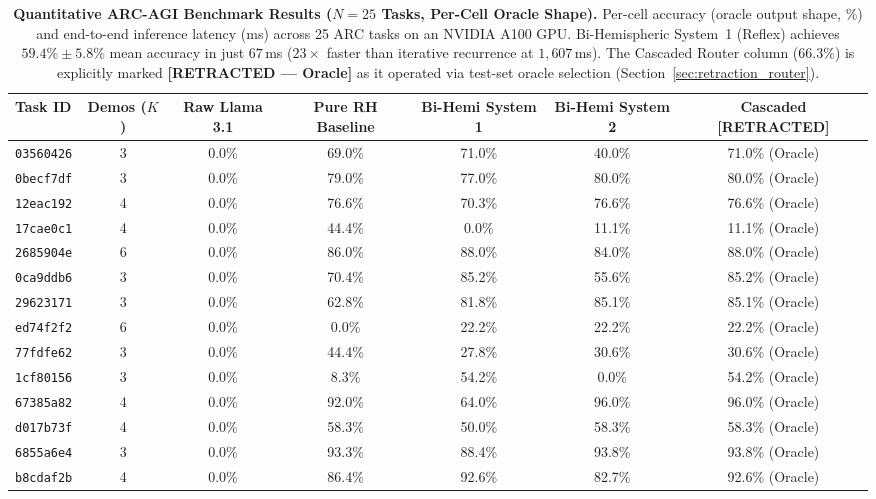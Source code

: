 \documentclass[11pt,a4paper]{article}
\theoremstyle{plain}
\theoremstyle{definition}
\theoremstyle{remark}
\begin{document}
\begin{table}[t]
\centering
\caption{\textbf{Quantitative ARC-AGI Benchmark Results ($N = 25$ Tasks, Per-Cell Oracle Shape).} Per-cell accuracy (oracle output shape, \%) and end-to-end inference latency (ms) across 25 ARC tasks on an NVIDIA A100 GPU. Bi-Hemispheric System~1 (Reflex) achieves $59.4\% \pm 5.8\%$ mean accuracy in just $67$\,ms ($23\times$ faster than iterative recurrence at $1{,}607$\,ms). The Cascaded Router column ($66.3\%$) is explicitly marked \textbf{[RETRACTED --- Oracle]} as it operated via test-set oracle selection (Section~\ref{sec:retraction_router}).}
\label{tab:benchmark_results}
\small
\begin{tabular}{lcccccc}
\toprule
\textbf{Task ID} & \textbf{Demos ($K$)} & \textbf{Raw Llama 3.1} & \textbf{Pure RH Baseline} & \textbf{Bi-Hemi System 1} & \textbf{Bi-Hemi System 2} & \textbf{Cascaded [RETRACTED]} \\
\midrule
\texttt{03560426} & 3 & 0.0\% & 69.0\% & 71.0\% & 40.0\% & 71.0\% (Oracle) \\
\texttt{0becf7df} & 3 & 0.0\% & 79.0\% & 77.0\% & 80.0\% & 80.0\% (Oracle) \\
\texttt{12eac192} & 4 & 0.0\% & 76.6\% & 70.3\% & 76.6\% & 76.6\% (Oracle) \\
\texttt{17cae0c1} & 4 & 0.0\% & 44.4\% &  0.0\% & 11.1\% & 11.1\% (Oracle) \\
\texttt{2685904e} & 6 & 0.0\% & 86.0\% & 88.0\% & 84.0\% & 88.0\% (Oracle) \\
\texttt{0ca9ddb6} & 3 & 0.0\% & 70.4\% & 85.2\% & 55.6\% & 85.2\% (Oracle) \\
\texttt{29623171} & 3 & 0.0\% & 62.8\% & 81.8\% & 85.1\% & 85.1\% (Oracle) \\
\texttt{ed74f2f2} & 6 & 0.0\% &  0.0\% & 22.2\% & 22.2\% & 22.2\% (Oracle) \\
\texttt{77fdfe62} & 3 & 0.0\% & 44.4\% & 27.8\% & 30.6\% & 30.6\% (Oracle) \\
\texttt{1cf80156} & 3 & 0.0\% &  8.3\% & 54.2\% &  0.0\% & 54.2\% (Oracle) \\
\texttt{67385a82} & 4 & 0.0\% & 92.0\% & 64.0\% & 96.0\% & 96.0\% (Oracle) \\
\texttt{d017b73f} & 4 & 0.0\% & 58.3\% & 50.0\% & 58.3\% & 58.3\% (Oracle) \\
\texttt{6855a6e4} & 3 & 0.0\% & 93.3\% & 88.4\% & 93.8\% & 93.8\% (Oracle) \\
\texttt{b8cdaf2b} & 4 & 0.0\% & 86.4\% & 92.6\% & 82.7\% & 92.6\% (Oracle) \\

\end{tabular}
\end{table}
\end{document}

